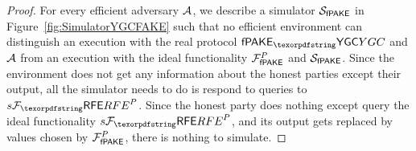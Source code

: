 \begin{proof}
For every efficient adversary $\mathcal{A}$, we describe a simulator $\mathcal{S}_{\textsf{fPAKE}}$ in Figure~\ref{fig:SimulatorYGCFAKE} such that no efficient environment can distinguish an execution with the real protocol $\PfakeYGC$ and $\mathcal{A}$ from an execution with the ideal functionality $\mathcal{F}_\textsf{fPAKE}^{P}$ and $\mathcal{S}_{\textsf{fPAKE}}$.
Since the environment does not get any information about the honest parties except their output, all the simulator needs to do is respond to queries to $\Fsrfe^{P}$.
Since the honest party does nothing except query the ideal functionality $\Fsrfe^{P}$, and its output gets replaced by values chosen by $\mathcal{F}_\textsf{fPAKE}^{P}$, there is nothing to simulate.


\end{proof}
